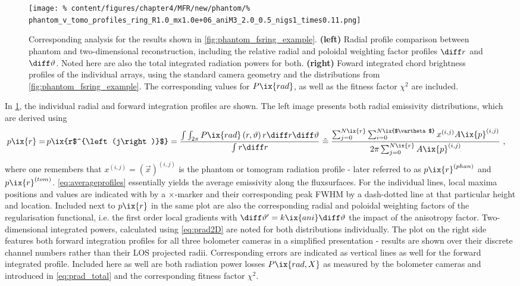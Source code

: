 %
           \begin{figure}[t]%
               \centering%
               \texttt{[image: \%
                   content/figures/chapter4/MFR/new/phantom/\%
                   phantom\_v\_tomo\_profiles\_ring\_R1.0\_mx1.0e+06\_aniM3\_2.0\_0.5\_nigs1\_times0.11.png]}%
               \caption{Corresponding analysis for the results shown in \cref{fig:phantom_fsring_example}. \textbf{(left)} Radial profile comparison between phantom and two-dimensional reconstruction, including the relative radial and poloidal weighting factor profiles $\diff r$ and $\diff\vartheta$. Noted here are also the total integrated radiation powers for both. \textbf{(right)} Foward integrated chord brightness profiles of the individual arrays, using the standard camera geometry and the distributions from \cref{fig:phantom_fsring_example}. The corresponding values for $P\ix{rad}$, as well as the fitness factor $\chi^2$ are included.}\label{fig:phantom_fsring_example_profiles}%
           \end{figure}%
%
           In \cref{fig:phantom_fsring_example_profiles}, the individual radial and forward integration profiles are shown. The left image presents both radial emissivity distributions, which are derived using%
%
           \begin{align}%
                p\ix{r}=\,&p\ix{r$^{\left(j\right)}$}=%
                \frac{\int\int_{2\pi}P\ix{rad}\left(r,\vartheta\right)r\diff r\diff\vartheta}{\int r\diff r}%
                \mathrel{\hat{=}}%
                \frac{\sum_{j=0}^{N\ix{r}}\sum_{i=0}^{N\ix{$\vartheta$}}x^{\left(i,j\right)}A\ix{p}^{\left(i,j\right)}}{%
                    2\pi\sum_{j=0}^{N\ix{r}}A\ix{p}^{\left(i,j\right)}}\,\,,\label{eq:averageprofiles}%
           \end{align}%
%
           where one remembers that $x^{\left(i,j\right)}=\left(\vec{x}\right)^{\left(i,j\right)}$ is the phantom or tomogram radiation profile - later referred to as $p\ix{r}^{\left(phan\right)}$ and $p\ix{r}^{\left(tom\right)}$. \autoref{eq:averageprofiles} essentially yields the average emissivity along the fluxsurfaces. For the individual lines, local maxima positions and values are indicated with by a $\times$-marker and their corresponding peak FWHM by a dash-dotted line at that particular height and location. Included next to $p\ix{r}$ in the same plot are also the corresponding radial and poloidal weighting factors of the regularisation functional, i.e. the first order local gradients with $\diff\vartheta^{\prime}=k\ix{ani}\diff\vartheta$ the impact of the anisotropy factor. Two-dimensional integrated powers, calculated using \cref{eq:prad2D} are noted for both distributions individually. The plot on the right side features both forward integration profiles for all three bolometer cameras in a simplified presentation - results are shown over their discrete channel numbers rather than their LOS projected radii. Corresponding errors are indicated as vertical lines as well for the forward integrated profile. Included here as well are both radiation power losses $P\ix{rad,X}$ as measured by the bolometer cameras and introduced in \cref{eq:prad_total} and the corresponding fitness factor $\chi^{2}$.\\%
